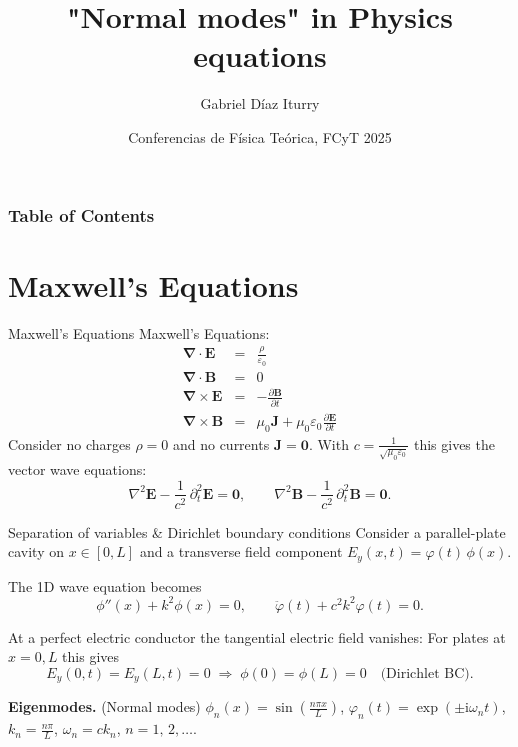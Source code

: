 \documentclass[aspectratio=169]{beamer}
\title{"Normal modes" in Physics equations}
\author{Gabriel D\'iaz Iturry}
\date{Conferencias de F\'isica Te\'orica, FCyT 2025}
\newcommand{\im}{\mathrm{i}} %
\begin{document}
\maketitle

\begin{frame}
\frametitle{Table of Contents}
\tableofcontents
\end{frame}



\section{Maxwell's Equations}

\begin{frame}{Maxwell's Equations}
    Maxwell's Equations:
    \begin{eqnarray}
        \bm{\nabla} \cdot \bm{E} & = &  \frac{\rho}{\varepsilon_0}  \\
        \bm{\nabla} \cdot \bm{B} & = & 0 \\
        \bm{\nabla} \times \bm{E} & = & - \frac{\partial \bm{B}}{\partial t} \\
        \bm{\nabla} \times \bm{B} & = & \mu_0 \bm{J} + \mu_0 \varepsilon_0  \frac{\partial \bm{E}}{\partial t}
    \end{eqnarray}
    \pause
    Consider no charges $\rho = 0$ and no currents $\bm{J} = \bm{0}$.
    With $c=\frac{1}{\sqrt{\mu_0\varepsilon_0}}$ this gives the vector wave equations:
    \[
    \nabla^2 \mathbf E - \frac{1}{c^2}\,\partial_t^2 \mathbf E = \mathbf 0,
    \qquad
    \nabla^2 \mathbf B - \frac{1}{c^2}\,\partial_t^2 \mathbf B = \mathbf 0.
    \]
\end{frame}

\begin{frame}{Separation of variables \& Dirichlet boundary conditions}
    Consider a parallel-plate cavity on $x\!\in\![0,L]$ and a transverse field component
    $E_y(x,t)=\varphi(t)\,\phi(x)$.

    \pause
    The 1D wave equation becomes 
    \[
    \phi''(x) + k^2 \phi(x) = 0, \qquad
    \ddot{\varphi}(t) + c^2 k^2 \varphi(t) = 0.
    \]

    \pause
    At a perfect electric conductor the tangential electric field vanishes:
    For plates at $x=0,L$ this gives
    \[
    E_y(0,t)=E_y(L,t)=0 \;\Rightarrow\; \phi(0)=\phi(L)=0 \quad\text{(Dirichlet BC).}
    \]

    \pause
    \textbf{Eigenmodes.} (Normal modes)
    $\phi_n(x)=\sin\!\left(\tfrac{n\pi x}{L}\right)$,\;
    $\varphi_n(t) = \exp(\pm \im \omega_n t)$, \;
    $k_n=\tfrac{n\pi}{L}$,\;
    $\omega_n=ck_n$,\;
    $n=1,\,2,\hdots$.
\end{frame}
\end{document}

